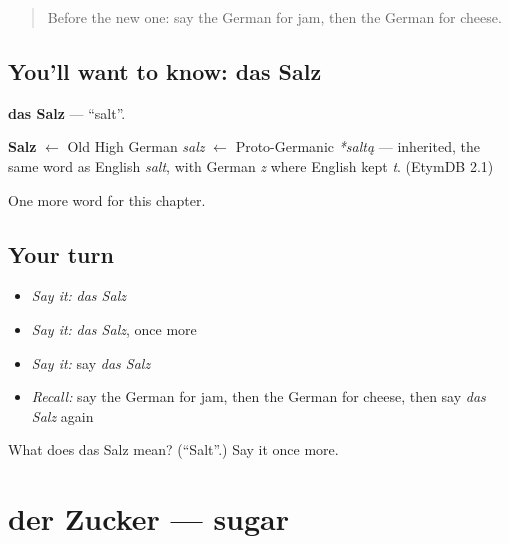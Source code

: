 \label{lesson:GE-C73-salz}



\begin{quote}
Before the new one: say the German for jam, then the German for cheese.
\end{quote}

\subsection*{You'll want to know: das Salz}
\textbf{das Salz} — \textquotedblleft{}salt\textquotedblright{}.

\begin{cousinweb}
\textbf{Salz} $\leftarrow$ Old High German \emph{salz} $\leftarrow$ Proto-Germanic \emph{*saltą} — inherited, the same word as English \emph{salt}, with German \emph{z} where English kept \emph{t}. (EtymDB 2.1)
\end{cousinweb}

\begin{grammarlens}[title={What you've built}]
One more word for this chapter.
\end{grammarlens}

\subsection*{Your turn}
\begin{itemize}
\raggedright
  \item \emph{Say it:} \emph{das Salz}
  \item \emph{Say it:} \emph{das Salz}, once more
  \item \emph{Say it:} say \emph{das Salz}
  \item \emph{Recall:} say the German for jam, then the German for cheese, then say \emph{das Salz} again
\end{itemize}

\begin{tcolorbox}[breakable,colback=teal!4,colframe=teal!35!black,title={Before you move on}]
What does das Salz mean? (\textquotedblleft{}Salt\textquotedblright{}.) Say it once more.
\end{tcolorbox}
\section[der Zucker]{der Zucker — sugar}

\label{lesson:GE-C73-zucker}



